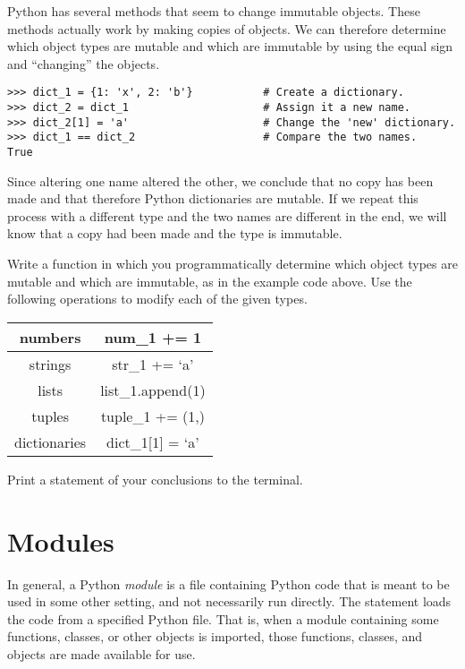 \begin{problem}
Python has several methods that seem to change immutable objects.
These methods actually work by making copies of objects.
We can therefore determine which object types are mutable and which are immutable by using the equal sign and ``changing'' the objects.

\begin{lstlisting}
>>> dict_1 = {1: 'x', 2: 'b'}           # Create a dictionary.
>>> dict_2 = dict_1                     # Assign it a new name.
>>> dict_2[1] = 'a'                     # Change the 'new' dictionary.
>>> dict_1 == dict_2                    # Compare the two names.
True
\end{lstlisting}

Since altering one name altered the other, we conclude that no copy has been made and that therefore Python dictionaries are mutable.
If we repeat this process with a different type and the two names are different in the end, we will know that a copy had been made and the type is immutable.

Write a function in which you programmatically determine which object types are mutable and which are immutable, as in the example code above.
Use the following operations to modify each of the given types.

\begin{center}
\begin{tabular}{|c|c|}
\hline
numbers & num\_1 += 1 \\
\hline
strings & str\_1 += `a' \\
\hline
lists & list\_1.append(1) \\
\hline
tuples & tuple\_1 += (1,) \\
\hline
dictionaries & dict\_1[1] = `a' \\
\hline
\end{tabular}
\end{center}
Print a statement of your conclusions to the terminal.
\end{problem}

\section*{Modules}

In general, a Python \emph{module} is a file containing Python code that is meant to be used in some other setting, and not necessarily run directly.
The  statement loads the code from a specified Python file.
That is, when a module containing some functions, classes, or other objects is imported, those functions, classes, and objects are made available for use.

